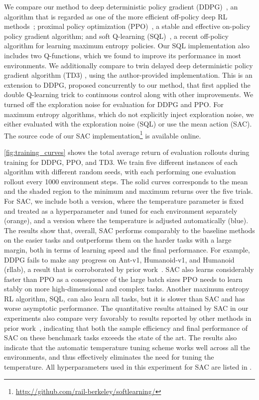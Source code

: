 We compare our method to deep deterministic policy gradient (DDPG)~\citep{lillicrap2015continuous}, an algorithm that is regarded as one of the more efficient off-policy deep RL methods~\citep{duan2016benchmarking}; proximal policy optimization (PPO)~\citep{schulman2017proximal}, a stable and effective on-policy policy gradient algorithm; and soft Q-learning (SQL)~\citep{haarnoja2017reinforcement}, a recent off-policy algorithm for learning maximum entropy policies. Our SQL implementation also includes two Q-functions, which we found to improve its performance in most environments.  We additionally compare to twin delayed deep deterministic policy gradient algorithm (TD3) \citep{fujimoto2018addressing}, using the author-provided implementation. This is an extension to DDPG, proposed concurrently to our method, that first applied the double Q-learning trick to continuous control along with other improvements. We turned off the exploration noise for evaluation for DDPG and PPO. For maximum entropy algorithms, which do not explicitly inject exploration noise, we either evaluated with the exploration noise (SQL) or use the mean action (SAC). The source code of our SAC implementation\footnote{\href{http://github.com/rail-berkeley/softlearning/}{http://github.com/rail-berkeley/softlearning/}} is available online. %

%
%
%
\autoref{fig:training_curves} shows the total average return of evaluation rollouts during training for DDPG, PPO, and TD3. We train five different instances of each algorithm with different random seeds, with each performing one evaluation rollout every 1000 environment steps. The solid curves corresponds to the mean and the shaded region to the minimum and maximum returns over the five trials. For SAC, we include both a version, where the temperature parameter is fixed and treated as a hyperparameter and tuned for each environment separately (orange), and a version where the temperature is adjusted automatically (blue). The results show that, overall, SAC performs comparably to the baseline methods on the easier tasks and outperforms them on the harder tasks with a large margin, both in terms of learning speed and the final performance. For example, DDPG fails to make any progress on Ant-v1, Humanoid-v1, and Humanoid (rllab), a result that is corroborated by prior work~\citep{gu2016q,duan2016benchmarking}. SAC also learns considerably faster than PPO as a consequence of the large batch sizes PPO needs to learn stably on more high-dimensional and complex tasks. Another maximum entropy RL algorithm, SQL, can also learn all tasks, but it is slower than SAC and has worse asymptotic performance. The quantitative results attained by SAC in our experiments also compare very favorably to results reported by other methods in prior work~\citep{duan2016benchmarking,gu2016q,henderson2017deep}, indicating that both the sample efficiency and final performance of SAC on these benchmark tasks exceeds the state of the art. The results also indicate that the automatic temperature tuning scheme works well across all the environments, and thus effectively eliminates the need for tuning the temperature. All hyperparameters used in this experiment for SAC are listed in . 

